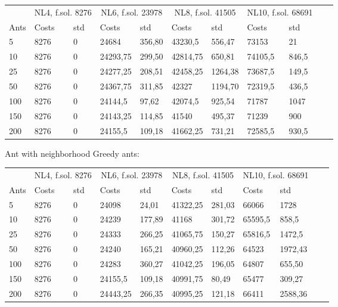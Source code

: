 \begin{minipage}[b]{1.0\textwidth}
    \begin{tabular}{ l | ll | ll | ll | ll | ll}
	\hline
	& \multicolumn{2}{c}{NL4, f.sol. 8276} & \multicolumn{2}{c}{NL6, f.sol. 23978}
	& \multicolumn{2}{c}{NL8, f.sol. 41505} & \multicolumn{2}{c}{NL10, f.sol. 68691} \\
	\cline{1-9}
	Ants & Costs & std & Costs & std & Costs & std & Costs & std \\
	\hline
	5     &  8276    & 0 &  24684    & 356,80 &  43230,5    & 556,47 &  73153  &	21 \\
	10    &  8276    & 0 &  24293,75 & 299,50 &  42814,75    & 650,81 &  74105,5    & 846,5 \\
	25    &  8276    & 0 &  24277,25 & 208,51 &  42458,25    & 1264,38 &  73687,5    & 149,5 \\
	50    &  8276    & 0 &  24367,75 & 311,85 &  42327    & 1194,70 &  72319,5    & 436,5\\
	100   &  8276    & 0 &  24144,5  & 97,62  &  42074,5    & 925,54 &  71787    & 1047 \\
	150   &  8276    & 0 &  24143,25 & 114,85 &  41540    & 495,37 &  71239   & 900\\
	200   &  8276    & 0 &  24155,5  & 109,18 &  41662,25    & 731,21 &  72585,5    & 930,5\\
	\hline
	\end{tabular}
\end{minipage}
\newline
Ant with neighborhood Greedy ants:
\newline
\begin{minipage}[b]{1.0\textwidth}
    \begin{tabular}{ l | ll | ll | ll | ll | ll}
	\hline
	& \multicolumn{2}{c}{NL4, f.sol. 8276} & \multicolumn{2}{c}{NL6, f.sol. 23978}
	& \multicolumn{2}{c}{NL8, f.sol. 41505} & \multicolumn{2}{c}{NL10, f.sol. 68691} \\
	\cline{1-9}
	Ants & Costs & std & Costs & std & Costs & std & Costs & std \\
	\hline
	5     &  8276  & 0 &    24098   & 24,01  &  41322,25    & 281,03 &  66066   & 1728 \\
	10    &  8276  & 0 &    24239   & 177,89 &  41168       & 301,72 &  65595,5   & 858,5 \\
	25    &  8276  & 0 &    24333   & 266,25 &  41065,75    & 150,27 &  65816,5    & 1472,5 \\
	50    &  8276  & 0 &    24240   & 165,21 &  40960,25    & 112,26 &  64523    & 1972,43 \\
	100   &  8276  & 0 &    24283   & 360,27 &  41042,25    & 196,05 &  64807    & 655,50 \\
	150   &  8276  & 0 &  24155,5   & 109,18 &  40991,75    & 80,49  &  65477    & 309,27 \\
	200   &  8276  & 0 &  24443,25  & 266,35 &  40995,25    & 121,18 &  66411    & 2588,36	\\
	\hline
	\end{tabular}
\end{minipage}
